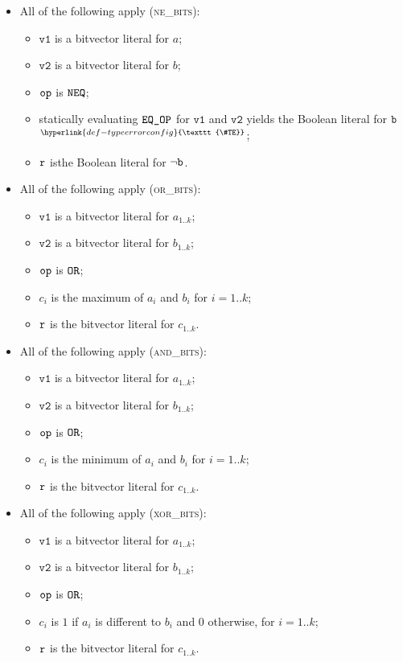 \documentclass{book}
\newcommand\TypeErrorConfig[0]{\hyperlink{def-typeerrorconfig}{\texttt{\#TE}}}
\newcommand\ProseOrTypeError[0]{\hyperlink{def-proseortypeerror}{$^{\TypeErrorConfig}$}}
\newcommand\vvone[0]{\texttt{v1}}
\newcommand\vvtwo[0]{\texttt{v2}}
\begin{document}
\begin{itemize}
  \item All of the following apply (\textsc{ne\_bits}):
  \begin{itemize}
    \item $\vvone$ is a bitvector literal for $a$;
    \item $\vvtwo$ is a bitvector literal for $b$;
    \item $\texttt{op}$ is $\texttt{NEQ}$;
    \item statically evaluating $\texttt{EQ\_OP}$ for $\vvone$ and $\vvtwo$ yields the Boolean literal for $\texttt{b}$ \ProseOrTypeError;
    \item $\texttt{r}$ isthe Boolean literal for $\neg\texttt{b}$.
  \end{itemize}

  \item All of the following apply (\textsc{or\_bits}):
  \begin{itemize}
    \item $\vvone$ is a bitvector literal for $a_{1..k}$;
    \item $\vvtwo$ is a bitvector literal for $b_{1..k}$;
    \item $\texttt{op}$ is $\texttt{OR}$;
    \item $c_i$ is the maximum of $a_i$ and $b_i$ for $i=1..k$;
    \item $\texttt{r}$ is the bitvector literal for $c_{1..k}$.
  \end{itemize}

  \item All of the following apply (\textsc{and\_bits}):
  \begin{itemize}
    \item $\vvone$ is a bitvector literal for $a_{1..k}$;
    \item $\vvtwo$ is a bitvector literal for $b_{1..k}$;
    \item $\texttt{op}$ is $\texttt{OR}$;
    \item $c_i$ is the minimum of $a_i$ and $b_i$ for $i=1..k$;
    \item $\texttt{r}$ is the bitvector literal for $c_{1..k}$.
  \end{itemize}

  \item All of the following apply (\textsc{xor\_bits}):
  \begin{itemize}
    \item $\vvone$ is a bitvector literal for $a_{1..k}$;
    \item $\vvtwo$ is a bitvector literal for $b_{1..k}$;
    \item $\texttt{op}$ is $\texttt{OR}$;
    \item $c_i$ is $1$ if $a_i$ is different to $b_i$ and $0$ otherwise, for $i=1..k$;
    \item $\texttt{r}$ is the bitvector literal for $c_{1..k}$.
  \end{itemize}


\end{itemize}
\end{document}
